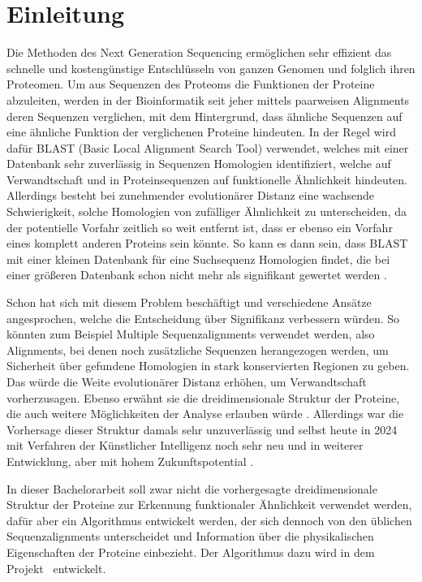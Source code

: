 \section{Einleitung} %
    \label{sec:einleitung}
    Die Methoden des Next Generation Sequencing ermöglichen sehr effizient das schnelle und kostengünstige Entschlüsseln von ganzen Genomen und folglich ihren Proteomen. Um aus Sequenzen des Proteoms die Funktionen der Proteine abzuleiten, werden in der Bioinformatik seit jeher mittels paarweisen Alignments deren Sequenzen verglichen, mit dem Hintergrund, dass ähnliche Sequenzen auf eine ähnliche Funktion der verglichenen Proteine hindeuten. In der Regel wird dafür BLAST (Basic Local Alignment Search Tool) verwendet, welches mit einer Datenbank sehr zuverlässig in Sequenzen Homologien identifiziert, welche auf Verwandtschaft und in Proteinsequenzen auf funktionelle Ähnlichkeit hindeuten. Allerdings besteht bei zunehmender evolutionärer Distanz eine wachsende Schwierigkeit, solche Homologien von zufälliger Ähnlichkeit zu unterscheiden, da der potentielle Vorfahr zeitlich so weit entfernt ist, dass er ebenso ein Vorfahr eines komplett anderen Proteins sein könnte. So kann es dann sein, dass BLAST mit einer kleinen Datenbank für eine Suchsequenz Homologien findet, die bei einer größeren Datenbank schon nicht mehr als signifikant gewertet werden .

    Schon  hat \citeauthor{similarity} sich mit diesem Problem beschäftigt und verschiedene Ansätze angesprochen, welche die Entscheidung über Signifikanz verbessern würden. So könnten zum Beispiel Multiple Sequenzalignments verwendet werden, also Alignments, bei denen noch zusätzliche Sequenzen herangezogen werden, um Sicherheit über gefundene Homologien in stark konservierten Regionen zu geben. Das würde die Weite evolutionärer Distanz erhöhen, um Verwandtschaft vorherzusagen. Ebenso erwähnt sie die dreidimensionale Struktur der Proteine, die auch weitere Möglichkeiten der Analyse erlauben würde \autocite{similarity}. Allerdings war die Vorhersage dieser Struktur damals sehr unzuverlässig und selbst heute in 2024 mit Verfahren der Künstlicher Intelligenz noch sehr neu und in weiterer Entwicklung, aber mit hohem Zukunftspotential \autocite{alphafold1}\autocite{alphafold}.

    In dieser Bachelorarbeit soll zwar nicht die vorhergesagte dreidimensionale Struktur der Proteine zur Erkennung funktionaler Ähnlichkeit verwendet werden, dafür aber ein Algorithmus entwickelt werden, der sich dennoch von den üblichen Sequenzalignments unterscheidet und Information über die physikalischen Eigenschaften der Proteine einbezieht. Der Algorithmus dazu wird in dem Projekt \protfin\ entwickelt.

